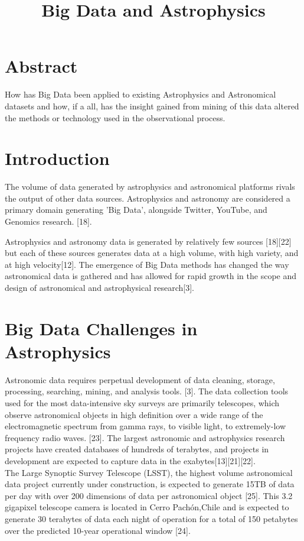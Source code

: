 \documentclass[letterpaper]{report}
\begin{document}
\title{Big Data and Astrophysics}
\maketitle

\section{Abstract}
How has Big Data been applied to existing Astrophysics and Astronomical datasets and how, if a all, has the insight gained from mining of this data altered the methods or technology used in the observational process.

\section{Introduction}
The volume of data generated by astrophysics and astronomical platforms rivals the output of other data sources. Astrophysics and astronomy are considered a primary domain generating 'Big Data', alongside Twitter, YouTube, and Genomics research. [18]. 

Astrophysics and astronomy data is generated by relatively few sources [18][22] but each of these sources generates data at a high volume, with high variety, and at high velocity[12]. The emergence of Big Data methods has changed the way astronomical data is gathered and has allowed for rapid growth in the scope and design of astronomical and astrophysical research[3]. 

\section{Big Data Challenges in Astrophysics}
Astronomic data requires perpetual development of data cleaning, storage, processing, searching, mining, and analysis tools. [3]. The data collection tools used for the most data-intensive sky surveys are primarily telescopes, which observe astronomical objects in high definition over a wide range of the electromagnetic spectrum from gamma rays, to visible light, to extremely-low frequency radio waves. [23]. The largest astronomic and astrophysics research projects have created databases of hundreds of terabytes, and projects in development are expected to capture data in the exabytes[13][21][22]. \\

The Large Synoptic Survey Telescope (LSST), the highest volume astronomical data project currently under construction, is expected to generate 15TB of data per day with over 200 dimensions of data per astronomical object [25]. This 3.2 gigapixel telescope camera is located in Cerro Pachón,Chile and is expected to generate 30 terabytes of data each night of operation for a total of 150 petabytes over the predicted 10-year operational window [24]. \\
\end{document}
